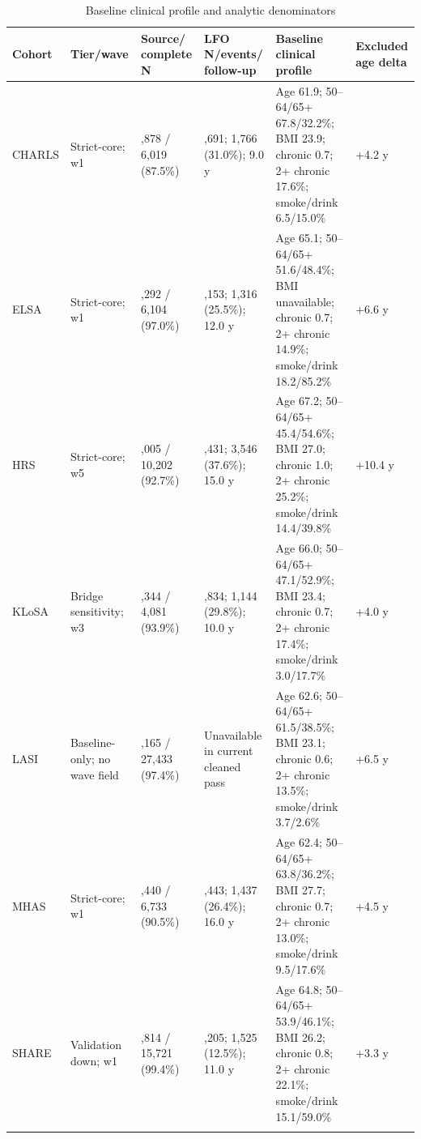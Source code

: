 \documentclass[pdflatex,sn-vancouver-num]{sn-jnl}
\begin{document}
\begin{table}[!htbp]
\singlespacing
\caption{Baseline clinical profile and analytic denominators}\label{tab:baseline-clinical}
\scriptsize
\setlength{\tabcolsep}{3pt}
\begin{tabular}{@{}>{\raggedright\arraybackslash}p{}>{\raggedright\arraybackslash}p{}>{\raggedright\arraybackslash}p{}>{\raggedright\arraybackslash}p{}>{\raggedright\arraybackslash}p{}>{\raggedright\arraybackslash}p{}@{}}
\toprule
Cohort & Tier/wave & Source/ complete N & LFO N/events/ follow-up & Baseline clinical profile & Excluded age delta\\
\midrule
CHARLS & Strict-core; w1 & 6,878 / 6,019 (87.5\%) & 5,691; 1,766 (31.0\%); 9.0 y & Age 61.9; 50--64/65+ 67.8/32.2\%; BMI 23.9; chronic 0.7; 2+ chronic 17.6\%; smoke/drink 6.5/15.0\% & +4.2 y\\
ELSA & Strict-core; w1 & 6,292 / 6,104 (97.0\%) & 5,153; 1,316 (25.5\%); 12.0 y & Age 65.1; 50--64/65+ 51.6/48.4\%; BMI unavailable; chronic 0.7; 2+ chronic 14.9\%; smoke/drink 18.2/85.2\% & +6.6 y\\
HRS & Strict-core; w5 & 11,005 / 10,202 (92.7\%) & 9,431; 3,546 (37.6\%); 15.0 y & Age 67.2; 50--64/65+ 45.4/54.6\%; BMI 27.0; chronic 1.0; 2+ chronic 25.2\%; smoke/drink 14.4/39.8\% & +10.4 y\\
KLoSA & Bridge sensitivity; w3 & 4,344 / 4,081 (93.9\%) & 3,834; 1,144 (29.8\%); 10.0 y & Age 66.0; 50--64/65+ 47.1/52.9\%; BMI 23.4; chronic 0.7; 2+ chronic 17.4\%; smoke/drink 3.0/17.7\% & +4.0 y\\
LASI & Baseline-only; no wave field & 28,165 / 27,433 (97.4\%) & Unavailable in current cleaned pass & Age 62.6; 50--64/65+ 61.5/38.5\%; BMI 23.1; chronic 0.6; 2+ chronic 13.5\%; smoke/drink 3.7/2.6\% & +6.5 y\\
MHAS & Strict-core; w1 & 7,440 / 6,733 (90.5\%) & 5,443; 1,437 (26.4\%); 16.0 y & Age 62.4; 50--64/65+ 63.8/36.2\%; BMI 27.7; chronic 0.7; 2+ chronic 13.0\%; smoke/drink 9.5/17.6\% & +4.5 y\\
SHARE & Validation down; w1 & 15,814 / 15,721 (99.4\%) & 12,205; 1,525 (12.5\%); 11.0 y & Age 64.8; 50--64/65+ 53.9/46.1\%; BMI 26.2; chronic 0.8; 2+ chronic 22.1\%; smoke/drink 15.1/59.0\% & +3.3 y\\
\botrule
\end{tabular}
\end{table}
\end{document}
